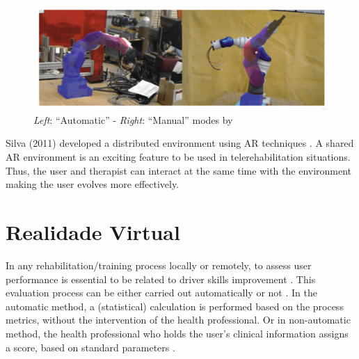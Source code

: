 \begin{figure}[!hbt]
\begin{center}
\includegraphics[width=1 \textwidth]{img/cap2/manring2020}
\caption{\textit{Left}: ``Automatic'' - \textit{Right}: ``Manual'' modes by \cite{manring2020}}
\label{fig:manring2020}
\end{center}
\end{figure}

Silva (2011) developed a distributed environment using AR techniques \cite{silva2011}. A shared AR environment is an exciting feature to be used in telerehabilitation situations. Thus, the user and therapist can interact at the same time with the environment making the user evolves more effectively. 


\section{Realidade Virtual}
\label{sec:trainingEvaluation}

In any rehabilitation/training process locally or remotely, to assess user performance is essential to be related to driver skills improvement \cite{macgillivray2018}. This evaluation process can be either carried out automatically or not \cite{john2018, massengale2005}. In the automatic method, a (statistical) calculation is performed based on the process metrics, without the intervention of the health professional\cite{john2018}. Or in non-automatic method, the health professional who holds the user's clinical information assigns a score, based on standard parameters \cite{massengale2005}.

